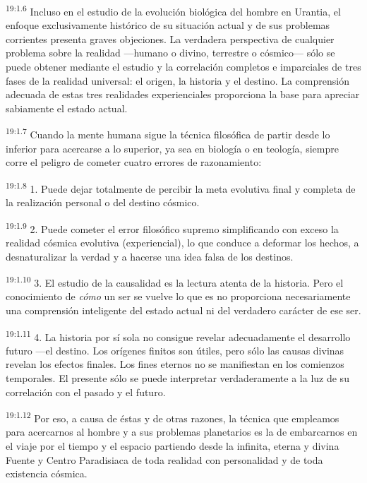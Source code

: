 \par
\textsuperscript{19:1.6} Incluso en el estudio de la evolución biológica del hombre en Urantia, el enfoque exclusivamente histórico de su situación actual y de sus problemas corrientes presenta graves objeciones. La verdadera perspectiva de cualquier problema sobre la realidad ---humano o divino, terrestre o cósmico--- sólo se puede obtener mediante el estudio y la correlación completos e imparciales de tres fases de la realidad universal: el origen, la historia y el destino. La comprensión adecuada de estas tres realidades experienciales proporciona la base para apreciar sabiamente el estado actual.

\par
\textsuperscript{19:1.7} Cuando la mente humana sigue la técnica filosófica de partir desde lo inferior para acercarse a lo superior, ya sea en biología o en teología, siempre corre el peligro de cometer cuatro errores de razonamiento:

\par
\textsuperscript{19:1.8} 1. Puede dejar totalmente de percibir la meta evolutiva final y completa de la realización personal o del destino cósmico.

\par
\textsuperscript{19:1.9} 2. Puede cometer el error filosófico supremo simplificando con exceso la realidad cósmica evolutiva (experiencial), lo que conduce a deformar los hechos, a desnaturalizar la verdad y a hacerse una idea falsa de los destinos.

\par
\textsuperscript{19:1.10} 3. El estudio de la causalidad es la lectura atenta de la historia. Pero el conocimiento de \textit{cómo} un ser se vuelve lo que es no proporciona necesariamente una comprensión inteligente del estado actual ni del verdadero carácter de ese ser.

\par
\textsuperscript{19:1.11} 4. La historia por sí sola no consigue revelar adecuadamente el desarrollo futuro ---el destino. Los orígenes finitos son útiles, pero sólo las causas divinas revelan los efectos finales. Los fines eternos no se manifiestan en los comienzos temporales. El presente sólo se puede interpretar verdaderamente a la luz de su correlación con el pasado y el futuro.

\par
\textsuperscript{19:1.12} Por eso, a causa de éstas y de otras razones, la técnica que empleamos para acercarnos al hombre y a sus problemas planetarios es la de embarcarnos en el viaje por el tiempo y el espacio partiendo desde la infinita, eterna y divina Fuente y Centro Paradisiaca de toda realidad con personalidad y de toda existencia cósmica.

